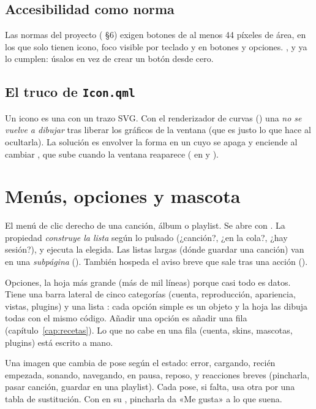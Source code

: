 \subsection{Accesibilidad como norma}

Las normas del proyecto ( §6) exigen botones de al menos 44 píxeles de
área,  en los que solo tienen icono, foco visible por teclado y
 en botones y opciones. ,
 y  ya lo cumplen: úsalos en vez de crear un botón desde cero.

\subsection{El truco de \texttt{Icon.qml}}

Un icono es una  con un trazo SVG. Con el renderizador de curvas ()
una  \emph{no se vuelve a dibujar} tras liberar los gráficos de la ventana (que es
justo lo que hace  al ocultarla). La solución es envolver la forma en un
 cuyo  se apaga y enciende al cambiar , que sube
cuando la ventana reaparece ( en  y
).

\section{Menús, opciones y mascota}

\begin{description}[style=nextline, leftmargin=0pt]
  \item[\archivo{ContextMenu.qml}] El menú de clic derecho de una canción, álbum o playlist.
  Se abre con . La propiedad  \emph{construye la lista}
  según lo pulsado (¿canción?, ¿en la cola?, ¿hay sesión?), y  ejecuta la
  elegida. Las listas largas (dónde guardar una canción) van en una \emph{subpágina}
  (). También hospeda el aviso breve que sale tras una acción
  ().
  \item[\archivo{SettingsSheet.qml}] Opciones, la hoja más grande (más de mil líneas) porque
  casi todo es datos. Tiene una barra lateral de cinco categorías (cuenta, reproducción,
  apariencia, vistas, plugins) y una lista : cada opción simple es un objeto
   y la hoja las dibuja todas con el mismo
  código. Añadir una opción es añadir una fila (capítulo~\ref{cap:recetas}). Lo que no cabe en
  una fila (cuenta, skins, mascotas, plugins) está escrito a mano.
  \item[\archivo{Mascot.qml}] Una imagen que cambia de pose según el estado: error, cargando,
  recién empezada, sonando, navegando, en pausa, reposo, y reacciones breves (pincharla, pasar
  canción, guardar en una playlist). Cada pose, si falta, usa otra por una tabla de
  sustitución. Con  en su , pincharla da
  «Me gusta» a lo que suena.
\end{description}

